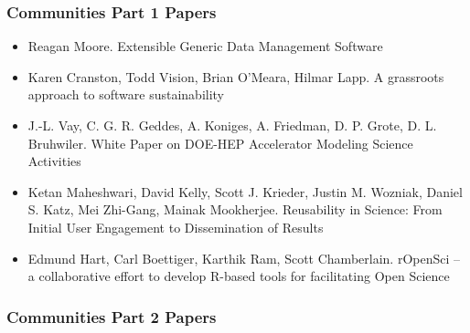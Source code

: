 \documentclass[11pt, oneside]{amsart}
\begin{document}
\subsubsection*{Communities Part 1 Papers}

\begin{itemize}

\item Reagan Moore. Extensible Generic Data Management Software
  \cite{Moore_WSSSPE}

\item Karen Cranston, Todd Vision, Brian O'Meara, Hilmar Lapp. A
  grassroots approach to software sustainability
  \cite{Cranston_WSSSPE}

\item J.-L. Vay, C. G. R. Geddes, A. Koniges, A. Friedman,
  D. P. Grote, D. L. Bruhwiler. White Paper on DOE-HEP Accelerator
  Modeling Science Activities \cite{Vay_WSSSPE}

\item Ketan Maheshwari, David Kelly, Scott J. Krieder, Justin M. Wozniak, Daniel S. Katz, Mei Zhi-Gang, Mainak Mookherjee. Reusability in Science: From Initial User Engagement to Dissemination of Results \cite{Maheshwari_WSSSPE}

\item Edmund Hart, Carl Boettiger, Karthik Ram, Scott Chamberlain. rOpenSci -- a collaborative effort to develop R-based tools for facilitating Open Science \cite{Hart_WSSSPE}

\end{itemize}

\subsubsection*{Communities Part 2 Papers}
\end{document}
